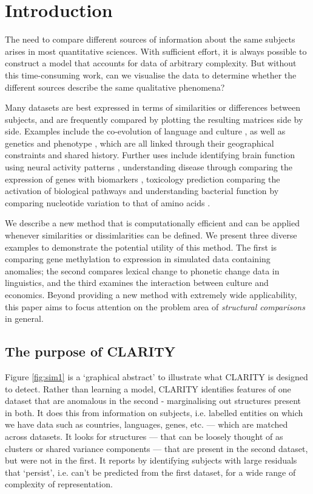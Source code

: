\documentclass[a4]{article}
\newcommand{\+}[1]{\mathbf{#1}}
\begin{document}
\section{Introduction}
\label{sec:intro}

The need to compare different sources of information about the same subjects arises in most quantitative sciences. With sufficient effort, it is always possible to construct a model that accounts for data of arbitrary complexity. But without this time-consuming work, can we visualise the data to determine whether the different sources describe the same qualitative phenomena?
 
Many datasets are best expressed in terms of similarities or differences between subjects, and are frequently compared by plotting the resulting matrices side by side. Examples include the co-evolution of language and culture \cite{SokalGeneticgeographiclinguistic1988}, as well as genetics and phenotype \cite{Creanzacomparisonworldwidephonemic2015}, which are all linked through their geographical constraints and shared history. Further uses include identifying brain function using neural activity patterns \cite{KriegeskorteRepresentationalSimilarityAnalysis2008a}, understanding disease through comparing the expression of genes with biomarkers \cite{GrigoriadisMolecularcharacterisationcell2012}, toxicology prediction comparing the activation of biological pathways \cite{RomerCrossplatformtoxicogenomicsprediction2014} and  understanding bacterial function by comparing nucleotide variation to that of amino acids \cite{ZhangCompletemitochondrialrDNA2018}.

We describe a new method that is computationally efficient and can be applied whenever similarities or dissimlarities can be defined. We present three diverse examples to demonstrate the potential utility of this method. The first is comparing gene methylation to expression in simulated data containing anomalies; the second compares lexical change to phonetic change data in linguistics, and the third examines the interaction between culture and economics. Beyond providing a new method with extremely wide applicability, this paper aims to focus attention on the problem area of \emph{structural comparisons} in general.

\subsection{The purpose of CLARITY}

Figure \ref{fig:sim1} is a `graphical abstract' to illustrate what CLARITY is designed to detect. Rather than learning a model, CLARITY identifies features of one dataset that are anomalous in the second - marginalising out structures present in both. It does this from information on subjects, i.e. labelled entities on which we have data such as countries, languages, genes, etc. --- which are matched across datasets. It looks for structures --- that can be loosely thought of as clusters or shared variance components --- that are present in the second dataset, but were not in the first. It reports by identifying subjects with large residuals that `persist', i.e. can't be predicted from the first dataset, for a wide range of complexity of representation. 
\end{document}
